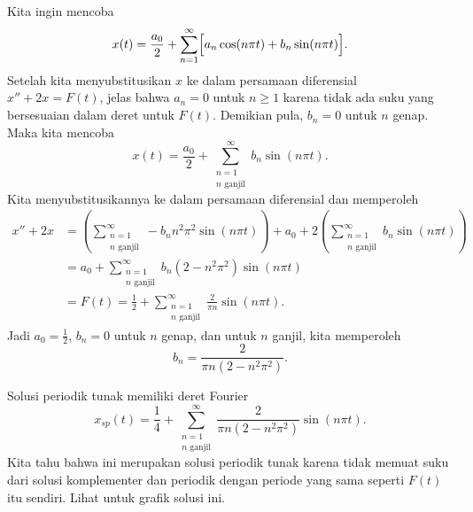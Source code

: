 \begin{example}
Kita ingin mencoba
\begin{equation*}
x(t) = \frac{a_0}{2} + \sum_{n=1}^\infty
\Bigl[
a_n \cos (n \pi t) +
b_n \sin (n \pi t)
\Bigr] .
\end{equation*}
Setelah kita menyubstitusikan $x$ ke dalam persamaan diferensial $x''+2x = F(t)$,
jelas bahwa $a_n = 0$ untuk $n \geq 1$ karena tidak ada suku yang bersesuaian
dalam deret untuk
$F(t)$.  Demikian pula, $b_n = 0$ untuk $n$ genap.  Maka kita mencoba
\begin{equation*}
x(t) = \frac{a_0}{2} +
\sum_{\substack{n=1 \\ n \text{ ganjil}}}^\infty
b_n \sin (n \pi t) .
\end{equation*}
Kita menyubstitusikannya ke dalam persamaan diferensial dan memperoleh
\begin{equation*}
\begin{split}
x'' + 2 x & =
\left(
\sum_{\substack{n=1 \\ n \text{ ganjil}}}^\infty
- b_n n^2 \pi^2 \sin (n \pi t)
\right)
+ 
a_0 +
2
\left(
\sum_{\substack{n=1 \\ n \text{ ganjil}}}^\infty
b_n \sin (n \pi t)
\right)
\\
& =
a_0 +
\sum_{\substack{n=1 \\ n \text{ ganjil}}}^\infty
b_n (2 - n^2 \pi^2 ) \sin (n \pi t)
\\
& =
F(t) = \frac{1}{2} + \sum_{\substack{n=1 \\ n \text{ ganjil}}}^\infty
\frac{2}{\pi n} \sin (n \pi t) .
\end{split}
\end{equation*}
Jadi $a_0 = \frac{1}{2}$, $b_n = 0$ untuk $n$ genap, dan untuk $n$ ganjil, kita
memperoleh
\begin{equation*}
b_n = 
\frac{2}{\pi n (2 - n^2 \pi^2 )} .
\end{equation*}

Solusi periodik tunak memiliki deret Fourier
\begin{equation*}
x_{sp}(t) = \frac{1}{4} + \sum_{\substack{n=1 \\ n \text{ ganjil}}}^\infty
\frac{2}{\pi n (2 - n^2 \pi^2 )}
\sin (n \pi t) .
\end{equation*}
Kita tahu bahwa ini merupakan solusi periodik tunak karena tidak memuat suku 
dari solusi komplementer dan periodik dengan periode yang sama seperti
$F(t)$ itu sendiri.  Lihat  untuk grafik solusi ini.
\begin{myfig}
\capstart
{}
\caption{Grafik solusi periodik tunak $x_{sp}$ dari
.%
\label{afs:steadyexfig}}
\end{myfig}
\end{example}

